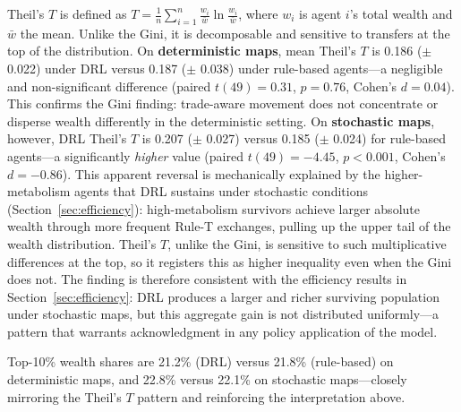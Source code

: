\documentclass[pdflatex,sn-mathphys-num]{sn-jnl}%
\theoremstyle{thmstyleone}%
\theoremstyle{thmstyletwo}%
\theoremstyle{thmstylethree}%
\begin{document}
Theil's $T$ is defined as $T = \frac{1}{n}\sum_{i=1}^{n} \frac{w_i}{\bar{w}} \ln \frac{w_i}{\bar{w}}$, where $w_i$ is agent $i$'s total wealth and $\bar{w}$ the mean.
Unlike the Gini, it is decomposable and sensitive to transfers at the top of the distribution.
On \textbf{deterministic maps}, mean Theil's $T$ is 0.186 ($\pm$ 0.022) under DRL versus 0.187 ($\pm$ 0.038) under rule-based agents---a negligible and non-significant difference (paired $t(49) = 0.31$, $p = 0.76$, Cohen's $d = 0.04$).
This confirms the Gini finding: trade-aware movement does not concentrate or disperse wealth differently in the deterministic setting.
On \textbf{stochastic maps}, however, DRL Theil's $T$ is 0.207 ($\pm$ 0.027) versus 0.185 ($\pm$ 0.024) for rule-based agents---a significantly \emph{higher} value (paired $t(49) = -4.45$, $p < 0.001$, Cohen's $d = -0.86$).
This apparent reversal is mechanically explained by the higher-metabolism agents that DRL sustains under stochastic conditions (Section~\ref{sec:efficiency}): high-metabolism survivors achieve larger absolute wealth through more frequent Rule-T exchanges, pulling up the upper tail of the wealth distribution.
Theil's $T$, unlike the Gini, is sensitive to such multiplicative differences at the top, so it registers this as higher inequality even when the Gini does not.
The finding is therefore consistent with the efficiency results in Section~\ref{sec:efficiency}: DRL produces a larger and richer surviving population under stochastic maps, but this aggregate gain is not distributed uniformly---a pattern that warrants acknowledgment in any policy application of the model.

Top-10\% wealth shares are 21.2\% (DRL) versus 21.8\% (rule-based) on deterministic maps, and 22.8\% versus 22.1\% on stochastic maps---closely mirroring the Theil's $T$ pattern and reinforcing the interpretation above.
\end{document}

